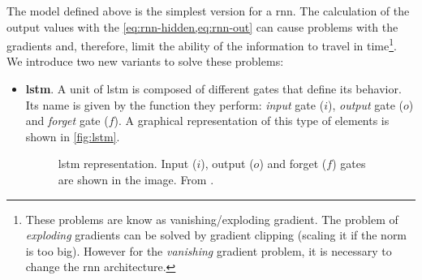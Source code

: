 The model defined above is the simplest version for a \gls{rnn}. The
calculation of the output values with the \vref{eq:rnn-hidden,eq:rnn-out} can
cause problems with the gradients and, therefore, limit the ability of the
information to travel in time\footnote{These problems are know as
  vanishing/exploding gradient. The problem of \emph{exploding} gradients can
  be solved by gradient clipping (scaling it if the norm is too big). However
  for the \emph{vanishing} gradient problem, it is necessary to change the
  \gls{rnn} architecture.}. We introduce two new variants to solve these
problems:
\begin{itemize}
  \item \textbf{\gls*{lstm}}. A unit of \gls{lstm} is composed of different
  gates that define its behavior. Its name is given by the function they
  perform: \emph{input} gate (\(i\)), \emph{output} gate (\(o\)) and
  \emph{forget} gate (\(f\)). A graphical representation of this type of
  elements is shown in \vref{fig:lstm}.
  \begin{figure}[ht]
    \centering
    
    \caption[\acl*{lstm}]{\acf{lstm} representation. Input (\(i\)), output
      (\(o\)) and forget (\(f\)) gates are shown in the image. From
      .}\label{fig:lstm}
  \end{figure}


\end{itemize}
